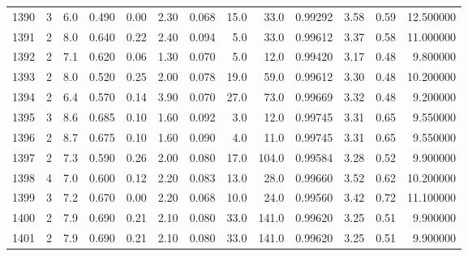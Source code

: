 \begin{tabular}{lrrrrrrrrrrrr}
1390 &        3 &            6.0 &             0.490 &         0.00 &            2.30 &      0.068 &                 15.0 &                  33.0 &  0.99292 &  3.58 &       0.59 &  12.500000 \\
1391 &        2 &            8.0 &             0.640 &         0.22 &            2.40 &      0.094 &                  5.0 &                  33.0 &  0.99612 &  3.37 &       0.58 &  11.000000 \\
1392 &        2 &            7.1 &             0.620 &         0.06 &            1.30 &      0.070 &                  5.0 &                  12.0 &  0.99420 &  3.17 &       0.48 &   9.800000 \\
1393 &        2 &            8.0 &             0.520 &         0.25 &            2.00 &      0.078 &                 19.0 &                  59.0 &  0.99612 &  3.30 &       0.48 &  10.200000 \\
1394 &        2 &            6.4 &             0.570 &         0.14 &            3.90 &      0.070 &                 27.0 &                  73.0 &  0.99669 &  3.32 &       0.48 &   9.200000 \\
1395 &        3 &            8.6 &             0.685 &         0.10 &            1.60 &      0.092 &                  3.0 &                  12.0 &  0.99745 &  3.31 &       0.65 &   9.550000 \\
1396 &        2 &            8.7 &             0.675 &         0.10 &            1.60 &      0.090 &                  4.0 &                  11.0 &  0.99745 &  3.31 &       0.65 &   9.550000 \\
1397 &        2 &            7.3 &             0.590 &         0.26 &            2.00 &      0.080 &                 17.0 &                 104.0 &  0.99584 &  3.28 &       0.52 &   9.900000 \\
1398 &        4 &            7.0 &             0.600 &         0.12 &            2.20 &      0.083 &                 13.0 &                  28.0 &  0.99660 &  3.52 &       0.62 &  10.200000 \\
1399 &        3 &            7.2 &             0.670 &         0.00 &            2.20 &      0.068 &                 10.0 &                  24.0 &  0.99560 &  3.42 &       0.72 &  11.100000 \\
1400 &        2 &            7.9 &             0.690 &         0.21 &            2.10 &      0.080 &                 33.0 &                 141.0 &  0.99620 &  3.25 &       0.51 &   9.900000 \\
1401 &        2 &            7.9 &             0.690 &         0.21 &            2.10 &      0.080 &                 33.0 &                 141.0 &  0.99620 &  3.25 &       0.51 &   9.900000 \\

\end{tabular}
